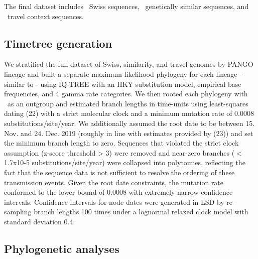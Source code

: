\documentclass[9pt,twocolumn,twoside,lineno]{pnas-new}
\begin{document}

The final dataset includes \nswissseqs\ Swiss sequences, \nsimseqs\ genetically similar sequences, and \ntravelseqs\ travel context sequences.

\subsection{Timetree generation}
We stratified the full dataset of Swiss, similarity, and travel genomes by PANGO lineage and built a separate maximum-likelihood phylogeny for each lineage - similar to \cite{DuPlessis2020} - using IQ-TREE \cite{Nguyen2014} with an HKY substitution model, empirical base frequencies, and 4 gamma rate categories. We then rooted each phylogeny with \outgroupisl\ as an outgroup and estimated branch lengths in time-units using least-squares dating (22) with a strict molecular clock and a minimum mutation rate of 0.0008 substitutions/site/year. We additionally assumed the root date to be between 15. Nov. and 24. Dec. 2019 (roughly in line with estimates provided by (23)) and set the minimum branch length to zero. Sequences that violated the strict clock assumption (z-score threshold > 3) were removed and near-zero branches ($<$1.7x10-5 substitutions/site/year) were collapsed into polytomies, reflecting the fact that the sequence data is not sufficient to resolve the ordering of these transmission events. Given the root date constraints, the mutation rate conformed to the lower bound of 0.0008 with extremely narrow confidence intervals. Confidence intervals for node dates were generated in LSD by re- sampling branch lengths 100 times under a lognormal relaxed clock model with standard deviation 0.4.

\subsection{Phylogenetic analyses}
\end{document}
